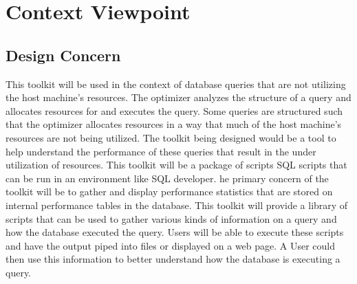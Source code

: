 \documentclass[draftclsnofoot, onecolumn, compsoc, 10pt]{IEEEtran}
\begin{document}
\bgroup
\def\arraystretch{1.5}
\egroup


\section{Context Viewpoint}
\subsection{Design Concern}
This toolkit will be used in the context of database queries that are not utilizing the host machine's resources.
The optimizer analyzes the structure of a query and allocates resources for and executes the query.
Some queries are structured such that the optimizer allocates resources in a way that much of the host machine's resources are not being utilized.
The toolkit being designed would be a tool to help understand the performance of these queries that result in the under utilization of resources.
This toolkit will be a package of scripts SQL scripts that can be run in an environment like SQL developer.
he primary concern of the toolkit will be to gather and display performance statistics that are stored on internal performance tables in the database.
This toolkit will provide a library of scripts that can be used to gather various kinds of information on a query and how the database executed the query.
Users will be able to execute these scripts and have the output piped into files or displayed on a web page.
A User could then use this information to better understand how the database is executing a query.
\end{document}
